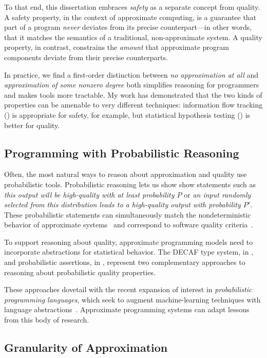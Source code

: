 To that end, this dissertation embraces \emph{safety} as a separate concept
from quality.
A safety property, in the context of approximate computing, is a guarantee
that part of a program \emph{never} deviates from its precise counterpart---in
other words, that it matches the semantics of a traditional, non-approximate
system.
A quality property, in contrast, constrains the \emph{amount} that approximate
program components deviate from their precise counterparts.

In practice, we find a first-order distinction between \emph{no approximation at
all} and \emph{approximation of some nonzero degree} both simplifies reasoning
for programmers and makes tools more tractable.
My work has demonstrated that the two kinds of properties can be amenable to
very different techniques:
information flow tracking () is appropriate for safety, for
example, but statistical hypothesis testing () is better for
quality.

\subsection{Programming with Probabilistic Reasoning}

Often, the most natural ways to reason about approximation and quality use
probabilistic tools.
Probabilistic reasoning lets us show show statements such as \emph{this output
will be high-quality with at least probability $P$} or \emph{an input randomly
selected from this distribution leads to a high-quality output with
probability $P'$}.
These probabilistic statements can simultaneously match the nondeterministic behavior
of approximate systems~\cite{truffle, npu, approxstorage}
and correspond to software quality criteria~\cite{decaf, passert}.

To support reasoning about quality, approximate
programming models need to incorporate abstractions for statistical behavior.
The DECAF type system, in , and
probabilistic assertions, in , represent two
complementary approaches to reasoning about probabilistic quality
properties.

These approaches dovetail with the recent expansion of interest in
\emph{probabilistic programming languages}, which seek to augment
machine-learning techniques with language abstractions~\cite{church}.
Approximate programming systems can adapt lessons from this body of research.

\subsection{Granularity of Approximation}
\label{sec:princ:granularity}

